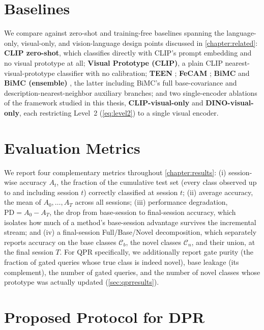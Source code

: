\documentclass{iutbscthesis}
\begin{document}
\section{Baselines}

We compare against zero-shot and training-free baselines spanning the language-only, visual-only, and vision-language design points discussed in \autoref{chapter:related}: \textbf{CLIP zero-shot}, which classifies directly with CLIP's prompt embedding and no visual prototype at all; \textbf{Visual Prototype (CLIP)}, a plain CLIP nearest-visual-prototype classifier with no calibration; \textbf{TEEN} \autocite{wang2023teen}; \textbf{FeCAM} \autocite{goswami2023fecam}; \textbf{BiMC} and \textbf{BiMC (ensemble)} \autocite{chen2025bimc}, the latter including BiMC's full base-covariance and description-nearest-neighbor auxiliary branches; and two single-encoder ablations of the framework studied in this thesis, \textbf{CLIP-visual-only} and \textbf{DINO-visual-only}, each restricting Level~2 (\autoref{eq:level2}) to a single visual encoder.

\section{Evaluation Metrics}

We report four complementary metrics throughout \autoref{chapter:results}: (i) session-wise accuracy $A_t$, the fraction of the cumulative test set (every class observed up to and including session $t$) correctly classified at session $t$; (ii) average accuracy, the mean of $A_0, \dots, A_T$ across all sessions; (iii) performance degradation, $\mathrm{PD} = A_0 - A_T$, the drop from base-session to final-session accuracy, which isolates how much of a method's base-session advantage survives the incremental stream; and (iv) a final-session Full/Base/Novel decomposition, which separately reports accuracy on the base classes $\mathcal{C}_b$, the novel classes $\mathcal{C}_n$, and their union, at the final session $T$. For QPR specifically, we additionally report gate purity (the fraction of gated queries whose true class is indeed novel), base leakage (its complement), the number of gated queries, and the number of novel classes whose prototype was actually updated (\autoref{sec:qprresults}).

\section{Proposed Protocol for DPR}
\end{document}
